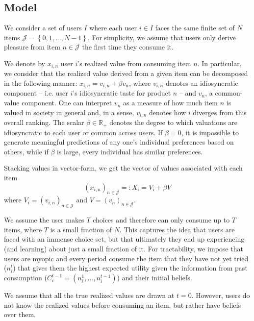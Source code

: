 \documentclass[manuscript]{acmart}
\newcommand{\xhdr}[1]{\vspace{1mm} \noindent{\bf #1}}
\begin{document}
\subsection{Model}
\par
\xhdr{Users.} We consider a set of users $I$ where each user $i \in I$ faces the same finite set of $N$ items $\mathcal J = \left\{0,1,...,N-1\right\}$. For simplicity, we assume that users only derive pleasure from item $n \in \mathcal{J}$ the first time they consume it.
\par

We denote by $x_{i,n}$ user $i$'s realized value from consuming item $n$. In particular, we consider that the realized value derived from a given item can be decomposed in the following manner: $x_{i,n}= v_{i,n} + \beta v_n$, where $v_{i,n}$ denotes an idiosyncratic component -- i.e. user $i$'s idiosyncratic taste for product $n$ --  and $v_{n}$, a common-value component. One can interpret $v_n$ as a measure of how much item $n$ is valued in society in general and, in a sense, $v_{i,n}$ denotes how $i$ diverges from this overall ranking. The scalar $\beta \in \mathbb{R}_{+}$ denotes the degree to which valuations are idiosyncratic to each user or common across users. If $\beta=0$, it is impossible to generate meaningful predictions of any one's individual preferences based on others, while if $\beta$ is large, every individual has similar preferences.
\par
Stacking values in vector-form, we get the vector of values associated with each item 
$${\left(x_{i,n}\right)}_{n \in \mathcal{J}}=:X_i =V_i+ \beta V $$
where $V_i ={\left(v_{i,n}\right)}_{n \in \mathcal{J}}$ and $V={\left(v_{n}\right)}_{n \in \mathcal{J}}$.
\par
\xhdr{User Decision-Making.}
We assume the user makes $T$ choices and therefore can only consume up to $T$ items, where $T$ is a small fraction of $N$. This captures the idea that users are faced with an immense choice set, but that ultimately they end up experiencing (and learning) about just a small fraction of it. For tractability, we impose that users are myopic and every period consume the item that they have not yet tried ($n_i^t$) that gives them the highest expected utility given the information from past consumption ($C_i^{t-1}=(n_i^1,...,n_i^{t-1})$) and their initial beliefs.
\par
\xhdr{User Beliefs.} We assume that all the true realized values are drawn at $t = 0$. However, users do not know the realized values before consuming an item, but rather have beliefs over them.
\end{document}
